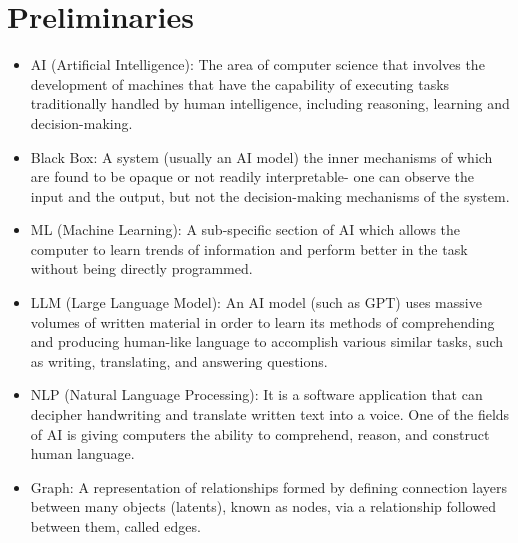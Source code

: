 \section{Preliminaries}

\begin{itemize}
  \item AI (Artificial Intelligence): The area of computer science that involves the development of machines that have the capability of executing tasks traditionally handled by human intelligence, including reasoning, learning and decision-making.

\vspace{1em}

\item Black Box: A system (usually an AI model) the inner mechanisms of which are found to be opaque or not readily interpretable- one can observe the input and the output, but not the decision-making mechanisms of the system.

\vspace{1em}

\item ML (Machine Learning): A sub-specific section of AI which allows the computer to learn trends of information and perform better in the task without being directly programmed.

\vspace{1em}

\item LLM (Large Language Model): An AI model (such as GPT) uses massive volumes of written material in order to learn its methods of comprehending and producing human-like language to accomplish various similar tasks, such as writing, translating, and answering questions.

\vspace{1em}

\item NLP (Natural Language Processing): It is a software application that can decipher handwriting and translate written text into a voice. One of the fields of AI is giving computers the ability to comprehend, reason, and construct human language.

\vspace{1em}

\item Graph: A representation of relationships formed by defining connection layers between many objects (latents), known as nodes, via a relationship followed between them, called edges.


\end{itemize}
